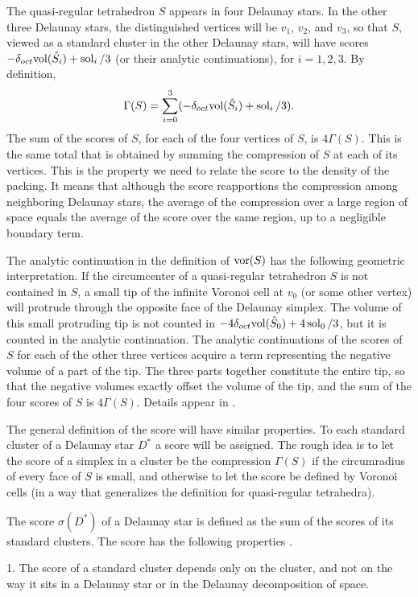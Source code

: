 The quasi-regular tetrahedron $S$ appears in four Delaunay stars.  In
the other three Delaunay stars, the distinguished vertices will
be $v_1$, $v_2$, and $v_3$, so that $S$, viewed as a standard cluster
in the other Delaunay stars, will have scores 
$-\delta_{oct}\hbox{vol}(\hat S_i) + \operatorname{sol}_i/3$
(or their analytic continuations),
for $i=1,2,3$.  
By definition,
$$\Gamma(S) = 
	\sum_{i=0}^3 (-\delta_{oct} \hbox{vol}(\hat S_i)+\operatorname{sol}_i/3).$$
The sum of the scores of $S$, for each
of the four vertices of $S$, is
$4\Gamma(S)$.  This is the same total that is obtained
by summing the compression of $S$ at each of its vertices.
This is the property we need to relate the score to
the density of the packing.  It means that although the
score reapportions the compression among neighboring Delaunay
stars, the average of the compression over a large region
of space equals the average of the score over the same region, 
up to a negligible boundary term.


The analytic continuation 
in the definition of $\operatorname{vor}(S)$
has the following geometric interpretation.
If the circumcenter of a quasi-regular tetrahedron
$S$ is not contained in $S$, a small tip of the infinite
Voronoi cell at $v_0$ (or some other vertex) will protrude through
the opposite face of the Delaunay simplex. The volume of this
 small protruding tip
is not counted in $-4\delta_{oct}\hbox{vol}(\hat S_0) + 4\operatorname{sol}_0/3$, but it is
counted in the analytic continuation.  The analytic continuations
of the scores of $S$ for each of the other three vertices
acquire a term representing the negative volume of a part
of the tip. The three parts together constitute the entire
tip, so that the negative volumes exactly offset the
volume of the tip, and the sum of the four scores
of $S$ is $4\Gamma(S)$.  Details appear in \cite{H4}.


The general definition of the score will have similar properties.
To each standard cluster of a Delaunay star $D^*$ a score will be 
assigned.
The rough idea is to
let the score of a simplex in a cluster be 
the compression $\Gamma(S)$
if the circumradius of every face of $S$ is small, and otherwise to
let the score be defined by Voronoi cells (in a way
that generalizes the definition for quasi-regular tetrahedra).

The score $\sigma(D^*)$
of a Delaunay star is defined as the sum of
the scores of its standard clusters.  The score has
the following properties \cite{H4,3.1 and 3.5}. 

1.  The score of a standard cluster depends only on 
	the cluster, and not on the way it sits in a Delaunay
	star or in the Delaunay decomposition of space.


